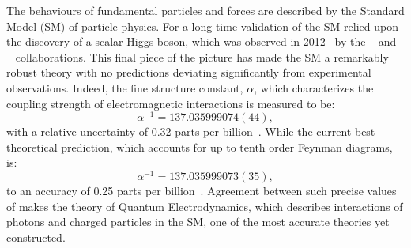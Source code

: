 The behaviours of fundamental particles and forces are described by the Standard Model (SM) of
particle physics.
For a long time validation of the SM relied upon the discovery of a scalar Higgs boson, which was
observed in 2012~\cite{Chatrchyan:2012ufa,Aad:2012tfa} by the
\cms~\cite{Chatrchyan:2012ufa} and \atlas~\cite{Aad:2012tfa} collaborations.
This final piece of the picture has made the SM a remarkably robust theory with no predictions
deviating significantly from experimental observations.
Indeed, the fine structure constant, $\alpha$, which characterizes the coupling strength of
electromagnetic interactions
is measured to be:
\begin{equation}
  \alpha^{-1} = 137.035 999 074 (44),
\end{equation}
with a relative uncertainty of 0.32 parts per billion~\cite{PDG2012}.
While the current best theoretical prediction, which accounts for up to tenth order Feynman
diagrams, is:
\begin{equation}
  \alpha^{-1} = 137.035 999 073 (35),
\end{equation}
to an accuracy of 0.25 parts per billion~\cite{Aoyama:2012wj}.
Agreement between such precise values of makes the theory of Quantum Electrodynamics, which
describes interactions of photons and charged particles in the SM, one of the most accurate
theories yet constructed.


